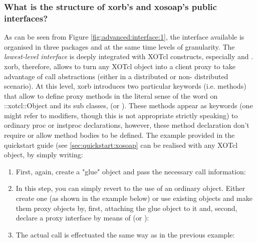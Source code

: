   \subsubsection{What is the structure of xorb's and xosoap's public interfaces?}\label{sec:advanced:interface:what}
As can be seen from Figure \ref{fig:advanced:interface:1}, the interface available is organised in three 
packages and at the same time levels of granularity. The \emph{lowest-level interface} is deeply 
integrated with XOTcl constructs, especially  and . xorb, therefore, allows to turn 
any XOTcl object into a client proxy to take advantage of call abstractions (either in a distributed or non-
distributed scenario). At this level, xorb introduces two particular keywords (i.e. methods) that allow to 
define proxy methods in the literal sense of the word on ::xotcl::Object and its sub classes, 
(or ). These methods appear as keywords (one might refer to modifiers, though this is 
not appropriate strictly speaking) to ordinary proc or instproc declarations, however, these method 
declaration don't require or allow method bodies to be defined. The example provided in the quickstart 
guide (see \ref{sec:quickstart:xosoap} can be realised with any XOTcl object, by simply writing:
  \begin{enumerate}
\item First, again, create a "glue" object and pass the necessary call information: 
\lstset{breaklines=true,numbers=left,basicstyle=\footnotesize,frame=single}

\item In this step, you can simply revert to the use of an ordinary object. Either create one (as shown in the example below) or use existing objects and make them proxy objects by, first, attaching the glue object to it and, second, declare a proxy interface by means of  (or ):


\item The actual call is effectuated the same way as in the previous example:

  \end{enumerate}
